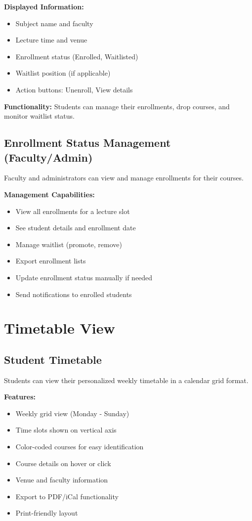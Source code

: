 \textbf{Displayed Information:}
\begin{itemize}
    \item Subject name and faculty
    \item Lecture time and venue
    \item Enrollment status (Enrolled, Waitlisted)
    \item Waitlist position (if applicable)
    \item Action buttons: Unenroll, View details
\end{itemize}

\textbf{Functionality:} Students can manage their enrollments, drop courses, and monitor waitlist status.

\subsection{Enrollment Status Management (Faculty/Admin)}
Faculty and administrators can view and manage enrollments for their courses.

\textbf{Management Capabilities:}
\begin{itemize}
    \item View all enrollments for a lecture slot
    \item See student details and enrollment date
    \item Manage waitlist (promote, remove)
    \item Export enrollment lists
    \item Update enrollment status manually if needed
    \item Send notifications to enrolled students
\end{itemize}

\section{Timetable View}

\subsection{Student Timetable}
Students can view their personalized weekly timetable in a calendar grid format.

\textbf{Features:}
\begin{itemize}
    \item Weekly grid view (Monday - Sunday)
    \item Time slots shown on vertical axis
    \item Color-coded courses for easy identification
    \item Course details on hover or click
    \item Venue and faculty information
    \item Export to PDF/iCal functionality
    \item Print-friendly layout
\end{itemize}

